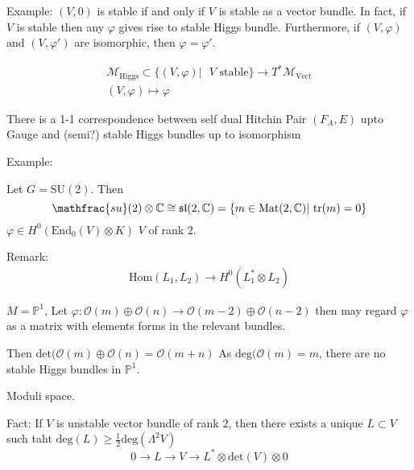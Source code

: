 Example: $(V,0)$ is stable if and only if $ V$ is stable as a vector bundle. 
In fact, if $ V$ is stable then any $\varphi$ gives rise to stable Higgs bundle. 
Furthermore, if $(V, \varphi)$ and $(V, \varphi') $ are isomorphic, then $ \varphi = \varphi'$.

\begin{align}
    \mathcal{M}_{\mathrm{Higgs}} \subset \{ ( V,\varphi) | \mbox{ $V$ stable} \} \rightarrow T^* \mathcal{M}_{\mathrm{Vect}} \\
    ( V, \varphi) \mapsto \varphi 
\end{align}

There is a 1-1 correspondence between self dual  Hitchin Pair $(F_A , E) $ upto Gauge 
and (semi?) stable Higgs bundles up to isomorphism 

Example: 

Let $ G = \mathrm{SU}(2) $. 
Then 
\begin{equation}
    \mathfrac{su}(2) \otimes \mathbb{C}  \cong \mathfrak{sl}(2, \mathbb{C} ) = \{ m \in \mathrm{Mat}(2, \mathbb{C} )| ~ \mathrm{tr}(m) = 0 \}
\end{equation}
$ \varphi \in H^0 ( \mathrm{End} _0 ( V) \otimes K) $ 
$V$ of rank 2. 

Remark: 
\begin{align}
    \mathrm{Hom} ( L_1 , L_2 ) \rightarrow  H^0 ( L_1 ^* \otimes L_2 ) 
\end{align}

$M = \mathbb{P} ^1 $, %
Let $ \varphi: \mathcal{O} ( m) \oplus \mathcal{O} ( n) \rightarrow  \mathcal{O} (m -2) \oplus \mathcal{O} (n-2) $ 
then may regard $\varphi $ as a matrix with elements forms in the relevant bundles. 

Then $ \mathrm{det}(\mathcal{O} ( m) \oplus \mathcal{O} (n) = \mathcal{O} (m+n) $
As $ \mathrm{deg}( \mathcal{O} (m) = m $, there are no stable Higgs bundles in $\mathbb{P} ^1$. 

Moduli space. 

Fact: If $V$ is unstable vector bundle of rank 2, 
then there exists a unique $L \subset V$ such taht 
$ \mathrm{deg}(L) \geq \frac{1}{2} \mathrm{deg} (\Lambda^2 V ) $ 
\begin{equation}
    0 \rightarrow  L \rightarrow V \rightarrow  L^* \otimes \mathrm{det} (V) \otimes 0 
\end{equation}

